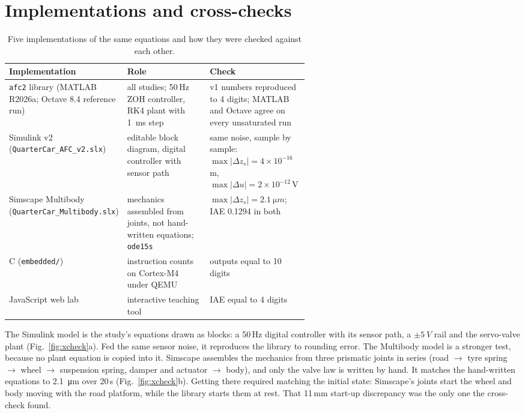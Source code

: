 \documentclass[10pt,a4paper]{article}
\begin{document}
\section{Implementations and cross-checks}
\begin{table}[!htbp]
\centering\small
\caption{Five implementations of the same equations and how they were checked against each other.}
\label{tab:impl}
\begin{tabularx}{\linewidth}{@{}>{\raggedright\arraybackslash}p{0.25\linewidth}>{\raggedright\arraybackslash}X>{\raggedright\arraybackslash}p{0.33\linewidth}@{}}
\toprule
Implementation & Role & Check\\
\midrule
\texttt{afc2} library (MATLAB R2026a; Octave 8.4 reference run) & all studies; 50\,Hz ZOH controller, RK4 plant with \SI{1}{ms} step & v1 numbers reproduced to 4 digits; MATLAB and Octave agree on every unsaturated run\\
Simulink v2 (\texttt{QuarterCar\_AFC\_v2.slx}) & editable block diagram, digital controller with sensor path & same noise, sample by sample: \(\max|\Delta z_s|=4\times10^{-16}\)\,m, \(\max|\Delta u|=2\times10^{-12}\)\,V\\
Simscape Multibody (\texttt{QuarterCar\_Multibody.slx}) & mechanics assembled from joints, not hand-written equations; \texttt{ode15s} & \(\max|\Delta z_s|=\SI{2.1}{\micro m}\); IAE 0.1294 in both\\
C (\texttt{embedded/}) & instruction counts on Cortex-M4 under QEMU & outputs equal to 10 digits\\
JavaScript web lab & interactive teaching tool & IAE equal to 4 digits\\
\bottomrule
\end{tabularx}
\end{table}

The Simulink model is the study's equations drawn as blocks: a 50\,Hz digital controller with its sensor path, a \(\pm\SI{5}{V}\) rail and the servo-valve plant (Fig.~\ref{fig:xcheck}a). Fed the same sensor noise, it reproduces the library to rounding error. The Multibody model is a stronger test, because no plant equation is copied into it. Simscape assembles the mechanics from three prismatic joints in series (road \(\to\) tyre spring \(\to\) wheel \(\to\) suspension spring, damper and actuator \(\to\) body), and only the valve law is written by hand. It matches the hand-written equations to \SI{2.1}{\micro m} over 20\,s (Fig.~\ref{fig:xcheck}b). Getting there required matching the initial state: Simscape's joints start the wheel and body moving with the road platform, while the library starts them at rest. That 11\,mm start-up discrepancy was the only one the cross-check found.
\end{document}
